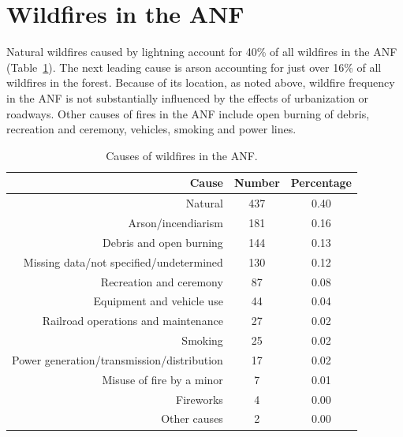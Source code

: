 \documentclass[12pt]{iopart}
\begin{document}
\section{Wildfires in the ANF}

Natural wildfires caused by lightning account for 40\% of all wildfires in the ANF (Table~\ref{WildfireCauses}). The next leading cause is arson accounting for just over 16\% of all wildfires in the forest. Because of its location, as noted above, wildfire frequency in the ANF is not substantially influenced by the effects of urbanization or roadways. Other causes of fires in the ANF include open burning of debris, recreation and ceremony, vehicles, smoking and power lines. 
\begin{table}[ht]
\centering
\begin{tabular}{rcc}
  \hline
Cause & Number & Percentage \\ 
  \hline
Natural & 437 & 0.40 \\ 
Arson/incendiarism & 181 & 0.16 \\ 
Debris and open burning & 144 & 0.13 \\ 
Missing data/not specified/undetermined & 130 & 0.12 \\ 
Recreation and ceremony &  87 & 0.08 \\ 
Equipment and vehicle use &  44 & 0.04 \\ 
Railroad operations and maintenance &  27 & 0.02 \\ 
Smoking &  25 & 0.02 \\
Power generation/transmission/distribution &  17 & 0.02 \\ 
Misuse of fire by a minor &   7 & 0.01 \\ 
Fireworks &   4 & 0.00 \\ 
Other causes &   2 & 0.00 \\ 
   \hline
\end{tabular}
\caption{\label{WildfireCauses} Causes of wildfires in the ANF.}
\end{table}
\end{document}
